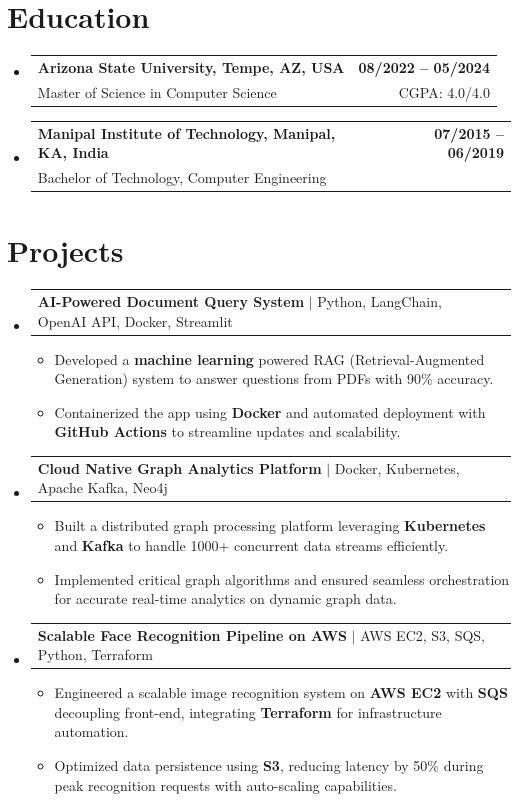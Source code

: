 \documentclass[letterpaper,11pt]{article}
\makeatletter
\newcommand{\resumeItem}[1]{
  \item\footnotesize{
    {#1 \vspace{-2pt}}
  }
}
\newcommand{\educationSubheading}[4]{
  \vspace{-2pt}\item
    \begin{tabular*}{1.0\textwidth}[t]{l@{\extracolsep{\fill}}r}
      \textbf{\small #1} & \textbf{\small #2} \\
      {\small#3} & {\small #4} \\
    \end{tabular*}\vspace{-7pt}
}
\newcommand{\resumeProjectHeading}[2]{
    \item
    \begin{tabular*}{1.001\textwidth}{l@{\extracolsep{\fill}}r}
      \small#1 & \textbf{\small #2}\\
    \end{tabular*}\vspace{-7pt}
}
\newcommand{\resumeSubHeadingListStart}{\begin{itemize}[leftmargin=0pt, label={}]}
\newcommand{\resumeSubHeadingListEnd}{\end{itemize}}
\newcommand{\resumeItemListStart}{\begin{itemize}[leftmargin=*]}
\newcommand{\resumeItemListEnd}{\end{itemize}\vspace{-5pt}}
\makeatother
\begin{document}
\section{Education}
  \resumeSubHeadingListStart
    \educationSubheading
      {Arizona State University, Tempe, AZ, USA}{08/2022 -- 05/2024}
      {Master of Science in Computer Science}{CGPA: 4.0/4.0}
    \educationSubheading
      {Manipal Institute of Technology, Manipal, KA, India}{07/2015 -- 06/2019}
      {Bachelor of Technology, Computer Engineering}{}
  \resumeSubHeadingListEnd

\section{Projects}
    \vspace{-5pt}
    \resumeSubHeadingListStart

      \resumeProjectHeading
          {\textbf{AI-Powered Document Query System} $|$ Python, LangChain, OpenAI API, Docker, Streamlit}{ }
        \resumeItemListStart
            \resumeItem{Developed a \textbf{machine learning} powered RAG (Retrieval-Augmented Generation) system to answer questions from PDFs with 90\% accuracy.}
            \resumeItem{Containerized the app using \textbf{Docker} and automated deployment with \textbf{GitHub Actions} to streamline updates and scalability.}
        \resumeItemListEnd
        \vspace{-12pt}

      \resumeProjectHeading
          {\textbf{Cloud Native Graph Analytics Platform} $|$ Docker, Kubernetes, Apache Kafka, Neo4j}{ }
        \resumeItemListStart
            \resumeItem{Built a distributed graph processing platform leveraging \textbf{Kubernetes} and \textbf{Kafka} to handle 1000+ concurrent data streams efficiently.}
            \resumeItem{Implemented critical graph algorithms and ensured seamless orchestration for accurate real-time analytics on dynamic graph data.}
        \resumeItemListEnd
        \vspace{-12pt}

      \resumeProjectHeading
          {\textbf{Scalable Face Recognition Pipeline on AWS} $|$ AWS EC2, S3, SQS, Python, Terraform}{ }
        \resumeItemListStart
            \resumeItem{Engineered a scalable image recognition system on \textbf{AWS EC2} with \textbf{SQS} decoupling front-end, integrating \textbf{Terraform} for infrastructure automation.}
            \resumeItem{Optimized data persistence using \textbf{S3}, reducing latency by 50\% during peak recognition requests with auto-scaling capabilities.}
        \resumeItemListEnd

    \resumeSubHeadingListEnd
\end{document}
